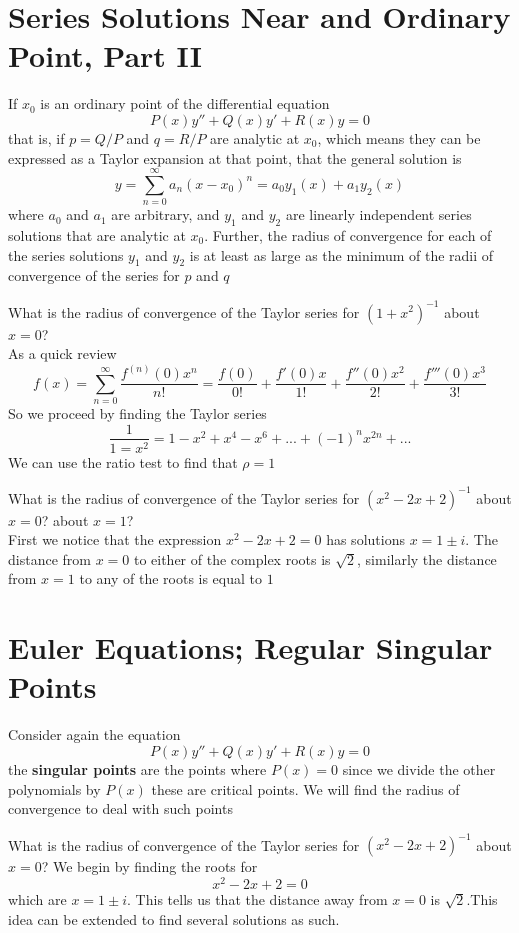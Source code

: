 \section{Series Solutions Near and Ordinary Point, Part II}
If $ x_0 $ is an ordinary point of the differential equation \[ P(x)y'' + Q(x) y' + R(x)y = 0 \] that is, if $ p = Q/P $ and $ q = R/P $ are analytic at $ x_0 $, which means they can be expressed as a Taylor expansion at that point, that the general solution is \[ y = \sum \limits_{n=0}^\infty a_n (x-x_0)^n = a_0 y_1 (x) + a_1 y_2 (x) \] where $ a_0 $ and $ a_1 $ are arbitrary, and $ y_1 $ and $ y_2 $ are linearly independent series solutions that are analytic at $ x_0 $. Further, the radius of convergence for each of the series solutions $ y_1 $ and $ y_2 $ is at least as large as the minimum of the radii of convergence of the series for $ p $ and $ q $ 
\begin{example}
	What is the radius of convergence of the Taylor series for $ (1+x^2)^{-1} $ about $ x = 0 $? \\
	As a quick review
	\[ f(x) = \sum \limits_{n=0}^\infty \dfrac{f^{(n)} (0) x^n }{n!} = \dfrac{f(0)}{0!} + \dfrac{f'(0)x}{1!} + \dfrac{f''(0)x^2}{2!} + \dfrac{f''' (0) x^3}{3!}\] 
	So we proceed by finding the Taylor series 
	\[ \dfrac{1}{1=x^2} = 1 -x ^2 + x^4 - x^6 + ... + (-1)^n x^{2n} + ...\]
	We can use the ratio test to find that $ \rho = 1 $
\end{example}
\begin{example}
	What is the radius of convergence of the Taylor series for $ (x^2 - 2x + 2)^{-1} $ about $ x = 0 $? about $ x = 1 $? \\
	First we notice that the expression $ x^2 - 2x + 2 = 0  $ has solutions $ x = 1 \pm i $. The distance from $ x=0 $ to either of the complex roots is $ \sqrt{2} $, similarly the distance from $ x =1 $ to any of the roots is equal to $ 1 $
\end{example}

\section{Euler Equations; Regular Singular Points}
Consider again the equation \[ P(x)y'' + Q(x)y' + R(x)y = 0 \] the \textbf{singular points} are the points where $ P(x) = 0  $ since we divide the other polynomials by $ P(x) $ these are critical points. We will find the radius of convergence to deal with such points 
\begin{example}
	What is the radius of convergence of the Taylor series for $ (x^2 - 2x + 2)^{-1} $ about $ x = 0 $? We begin by finding the roots for \[ x^2 - 2x + 2 = 0 \] which are $ x = 1 \pm i $. This tells us that the distance away from $ x = 0 $ is $ \sqrt{2}  $.This idea can be extended to find several solutions as such. 
\end{example}
